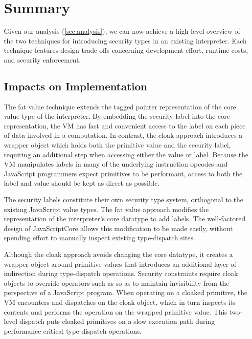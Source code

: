 \section{Summary}

Given our analysis (\autoref{sec:analysis}), we can now achieve a high-level overview of the two techniques for introducing security types in an existing interpreter.
Each technique features design trade-offs concerning development effort, runtime costs, and security enforcement.

\subsection{Impacts on Implementation}
The fat value technique extends the tagged pointer representation of the core value type of the interpreter.
By embedding the security label into the core representation, the VM has fast and convenient access to the label on each piece of data involved in a computation.
In contrast, the cloak approach introduces a wrapper object which holds both the primitive value and the security label, requiring an additional step when accessing either the value or label.
Because the VM manipulates labels in many of the underlying instruction opcodes and JavaScript programmers expect primitives to be performant, access to both the label and value should be kept as direct as possible.

The security labels constitute their own security type system, orthogonal to the existing JavaScript value types.
The fat value approach modifies the representation of the interpreter's core datatype to add labels.
The well-factored design of JavaScriptCore allows this modification to be made easily, without spending effort to manually inspect existing type-dispatch sites.

Although the cloak approach avoids changing the core datatype, it creates a wrapper object around primitive values that introduces an additional layer of indirection during type-dispatch operations.
Security constraints require cloak objects to override operators such as  so as to maintain invisibility from the perspective of a JavaScript program.
When operating on a cloaked primitive, the VM encounters and dispatches on the cloak object, which in turn inspects its contents and performs the operation on the wrapped primitive value.
This two-level dispatch puts cloaked primitives on a slow execution path during performance critical type-dispatch operations.

